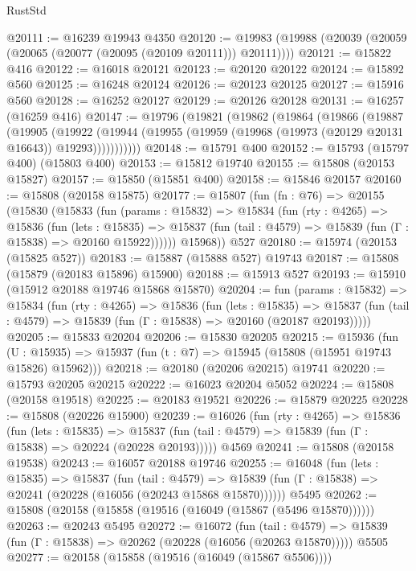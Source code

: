 \begin{lexlean}{RustStd}
\begin{coremodule}
@20111 := @16239 @19943 @4350
@20120 := @19983 (@19988 (@20039 (@20059 (@20065 (@20077 (@20095 (@20109 @20111))) @20111))))
@20121 := @15822 @416
@20122 := @16018 @20121
@20123 := @20120 @20122
@20124 := @15892 @560
@20125 := @16248 @20124
@20126 := @20123 @20125
@20127 := @15916 @560
@20128 := @16252 @20127
@20129 := @20126 @20128
@20131 := @16257 (@16259 @416)
@20147 := @19796
    (@19821
      (@19862
        (@19864
          (@19866
            (@19887
              (@19905
                (@19922
                  (@19944 (@19955 (@19959 (@19968 (@19973 (@20129 @20131 @16643)) @19293)))))))))))
@20148 := @15791 @400
@20152 := @15793 (@15797 @400) (@15803 @400)
@20153 := @15812 @19740
@20155 := @15808 (@20153 @15827)
@20157 := @15850 (@15851 @400)
@20158 := @15846 @20157
@20160 := @15808 (@20158 @15875)
@20177 := @15807
    (fun (fn : @76) =>
    @20155
      (@15830
        (@15833
          (fun (params : @15832) =>
          @15834
            (fun (rty : @4265) =>
            @15836
              (fun (lets : @15835) =>
              @15837 (fun (tail : @4579) => @15839 (fun (Γ : @15838) => @20160 @15922))))))
        @15968))
    @527
@20180 := @15974 (@20153 (@15825 @527))
@20183 := @15887 (@15888 @527) @19743
@20187 := @15808 (@15879 (@20183 @15896) @15900)
@20188 := @15913 @527
@20193 := @15910 (@15912 @20188 @19746 @15868 @15870)
@20204 := fun (params : @15832) =>
  @15834
    (fun (rty : @4265) =>
    @15836
      (fun (lets : @15835) =>
      @15837 (fun (tail : @4579) => @15839 (fun (Γ : @15838) => @20160 (@20187 @20193)))))
@20205 := @15833 @20204
@20206 := @15830 @20205
@20215 := @15936
    (fun (U : @15935) => @15937 (fun (t : @7) => @15945 (@15808 (@15951 @19743 @15826) @15962)))
@20218 := @20180 (@20206 @20215) @19741
@20220 := @15793 @20205 @20215
@20222 := @16023 @20204 @5052
@20224 := @15808 (@20158 @19518)
@20225 := @20183 @19521
@20226 := @15879 @20225
@20228 := @15808 (@20226 @15900)
@20239 := @16026
    (fun (rty : @4265) =>
    @15836
      (fun (lets : @15835) =>
      @15837 (fun (tail : @4579) => @15839 (fun (Γ : @15838) => @20224 (@20228 @20193)))))
    @4569
@20241 := @15808 (@20158 @19538)
@20243 := @16057 @20188 @19746
@20255 := @16048
    (fun (lets : @15835) =>
    @15837
      (fun (tail : @4579) =>
      @15839 (fun (Γ : @15838) => @20241 (@20228 (@16056 (@20243 @15868 @15870))))))
    @5495
@20262 := @15808 (@20158 (@15858 (@19516 (@16049 (@15867 (@5496 @15870))))))
@20263 := @20243 @5495
@20272 := @16072
    (fun (tail : @4579) => @15839 (fun (Γ : @15838) => @20262 (@20228 (@16056 (@20263 @15870)))))
    @5505
@20277 := @20158 (@15858 (@19516 (@16049 (@15867 @5506))))

\end{coremodule}
\end{lexlean}
